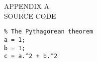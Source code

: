 \newpage
{}

\begin{center}
  APPENDIX A\\
  SOURCE CODE   
\end{center}
\bigskip

\begin{scriptsize}
\begin{lstlisting}
% The Pythagorean theorem
a = 1;
b = 1;
c = a.^2 + b.^2
\end{lstlisting}
\end{scriptsize}